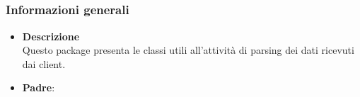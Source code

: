\subsection{}
\label{\nogloxy{swedesigner::server::parser}}
\subsubsection{Informazioni generali}
\begin{itemize}
\item \textbf{Descrizione}\\
Questo package presenta le classi utili all'attività di parsing dei dati ricevuti dai client.
\item \textbf{Padre}: \hyperref[\nogloxy{swedesigner::server}]{}
\end{itemize}

